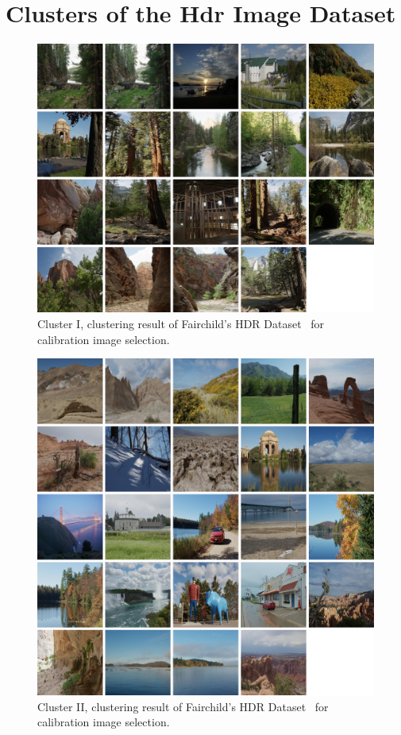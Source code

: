\appendix
\chapter{Clusters of the Hdr Image Dataset}
\label{app:clusters}

\begin{figure}[h!]
\begin{center}
\includegraphics[width=\textwidth]{appendix1/cluster1.png}
\caption{Cluster I, clustering result of Fairchild's HDR Dataset~\cite{fairchild2007hdr} for calibration image selection.}
\end{center}
\end{figure}

\begin{figure}
\begin{center}
\includegraphics[width=\textwidth]{appendix1/cluster2.png}
\caption{Cluster II, clustering result of Fairchild's HDR Dataset~\cite{fairchild2007hdr} for calibration image selection.}
\end{center}
\end{figure}

